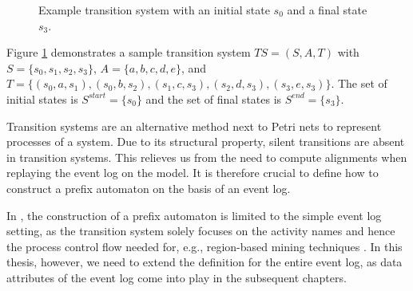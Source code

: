 \begin{figure}[H]
    \centering
    \caption{Example transition system with an initial state $s_0$ and a final state $s_3$.}
    \label{fig:example_transition_system}
\end{figure}

Figure \ref{fig:example_transition_system} demonstrates a sample transition system $\mathit{TS} = (S, A, T)$ with $S = \{s_0, s_1, s_2, s_3\}$, $A = \{a, b, c, d, e\}$, and $T = \{ (s_0, a, s_1), (s_0, b, s_2), (s_1, c, s_3), (s_2, d, s_3), (s_3, e, s_3) \}$. The set of initial states is $S^{start} = \{ s_0 \}$ and the set of final states is $S^{end} = \{ s_3 \}$. 

Transition systems are an alternative method next to Petri nets to represent processes of a system. Due to its structural property, silent transitions are absent in transition systems. This relieves us from the need to compute alignments when replaying the event log on the model. It is therefore crucial to define how to construct a prefix automaton on the basis of an event log.

In \cite{bible}, the construction of a prefix automaton is limited to the simple event log setting, as the transition system solely focuses on the activity names and hence the process control flow needed for, e.g., region-based mining techniques \cite{region-based-mining}. In this thesis, however, we need to extend the definition for the entire event log, as data attributes of the event log come into play in the subsequent chapters.

